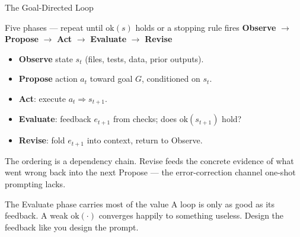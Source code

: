 \documentclass[9pt,t]{beamer}
\begin{document}
\begin{frame}{The Goal-Directed Loop}

\begin{block}{Five phases --- repeat until $\mathrm{ok}(s)$ holds or a stopping rule fires}
\textbf{Observe} $\to$ \textbf{Propose} $\to$ \textbf{Act} $\to$
\textbf{Evaluate} $\to$ \textbf{Revise}
\end{block}

\smallskip
\begin{itemize}
  \item \textbf{Observe} state $s_t$ (files, tests, data, prior outputs).
  \item \textbf{Propose} action $a_t$ toward goal $G$, conditioned on $s_t$.
  \item \textbf{Act}: execute $a_t \Rightarrow s_{t+1}$.
  \item \textbf{Evaluate}: feedback $e_{t+1}$ from checks; does $\mathrm{ok}(s_{t+1})$ hold?
  \item \textbf{Revise}: fold $e_{t+1}$ into context, return to Observe.
\end{itemize}

\medskip
The ordering is a dependency chain. \alert{Revise feeds the concrete evidence of
what went wrong back into the next Propose} --- the error-correction channel
one-shot prompting lacks.

\medskip
\begin{alertblock}{The Evaluate phase carries most of the value}
A loop is only as good as its feedback. A weak $\mathrm{ok}(\cdot)$ converges
happily to something useless. Design the feedback like you design the prompt.
\end{alertblock}
\end{frame}
\end{document}
